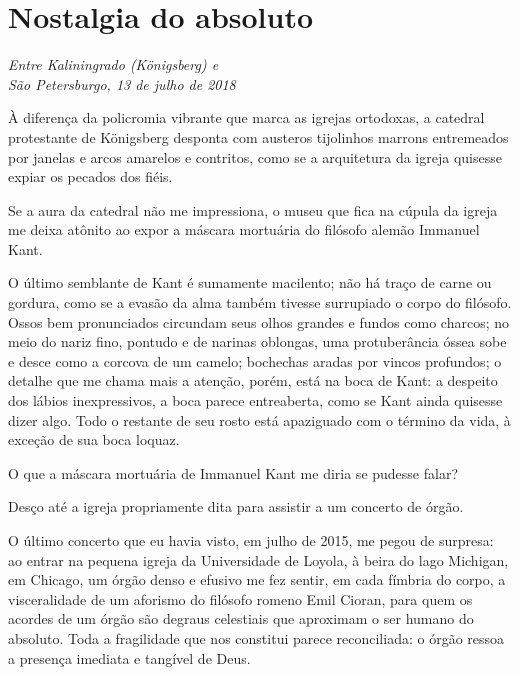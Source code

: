 \chapter*{Nostalgia do absoluto}

\begin{flushright}
\emph{Entre Kaliningrado (Königsberg) e\\ São Petersburgo, 13 de julho de 2018}
\end{flushright}

À diferença da policromia vibrante que marca as igrejas ortodoxas, a
catedral protestante de Königsberg desponta com austeros tijolinhos
marrons entremeados por janelas e arcos amarelos e contritos, como se a
arquitetura da igreja quisesse expiar os pecados dos fiéis.

Se a aura da catedral não me impressiona, o museu que fica na cúpula da
igreja me deixa atônito ao expor a máscara mortuária do filósofo alemão
Immanuel Kant.

O último semblante de Kant é sumamente macilento; não há traço de carne
ou gordura, como se a evasão da alma também tivesse surrupiado o corpo
do filósofo. Ossos bem pronunciados circundam seus olhos grandes e
fundos como charcos; no meio do nariz fino, pontudo e de narinas
oblongas, uma protuberância óssea sobe e desce como a corcova de um
camelo; bochechas aradas por vincos profundos; o detalhe que me chama
mais a atenção, porém, está na boca de Kant: a despeito dos lábios
inexpressivos, a boca parece entreaberta, como se Kant ainda quisesse
dizer algo. Todo o restante de seu rosto está apaziguado com o término
da vida, à exceção de sua boca loquaz.

O que a máscara mortuária de Immanuel Kant me diria se pudesse falar?

Desço até a igreja propriamente dita para assistir a um concerto de
órgão.

O último concerto que eu havia visto, em julho de 2015, me pegou de
surpresa: ao entrar na pequena igreja da Universidade de Loyola, à beira
do lago Michigan, em Chicago, um órgão denso e efusivo me fez sentir, em
cada fímbria do corpo, a visceralidade de um aforismo do filósofo romeno
Emil Cioran, para quem os acordes de um órgão são degraus celestiais que
aproximam o ser humano do absoluto. Toda a fragilidade que nos constitui
parece reconciliada: o órgão ressoa a presença imediata e tangível de
Deus.

